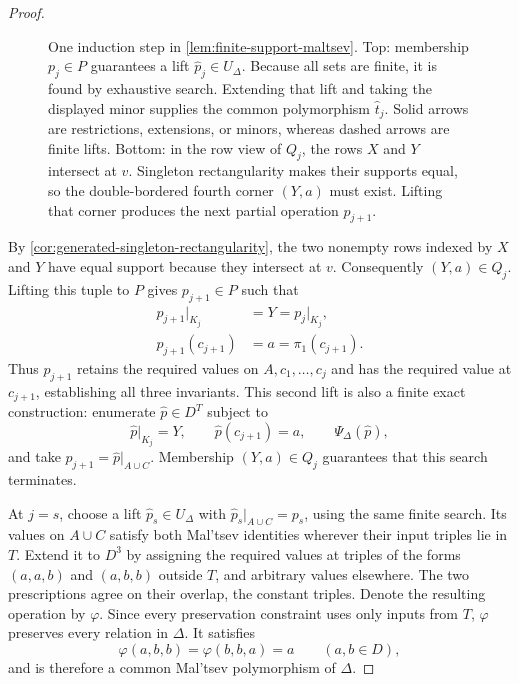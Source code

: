 \documentclass[11pt,letterpaper,onecolumn]{article}
\theoremstyle{plain}
\theoremstyle{definition}
\theoremstyle{remark}
\begin{document}
\begin{proof}
\begin{figure}[!t]
{%
  }
  \caption{One induction step in
    \cref{lem:finite-support-maltsev}.  Top: membership $p_j\in P$
    guarantees a lift $\widehat p_j\in U_\Delta$. Because all sets are
    finite, it is found by exhaustive search.  Extending that lift and taking
    the displayed minor supplies the common polymorphism $\widehat t_j$.  Solid arrows
    are restrictions, extensions, or minors, whereas dashed arrows are finite
    lifts.  Bottom: in the row view of $Q_j$, the rows $X$ and $Y$ intersect at
    $v$.  Singleton rectangularity makes their supports equal, so the
    double-bordered fourth corner $(Y,a)$ must exist.  Lifting that corner
    produces the next partial operation $p_{j+1}$.}
  \label{fig:finite-support-induction}
\end{figure}

By \cref{cor:generated-singleton-rectangularity}, the two nonempty rows
indexed by $X$ and $Y$ have equal support because they intersect at $v$.
Consequently $(Y,a)\in Q_j$.  Lifting this tuple to $P$ gives
$p_{j+1}\in P$ such that
\begin{equation*}
\begin{aligned}
  p_{j+1}|_{K_j}&=Y=p_j|_{K_j},\\
  p_{j+1}(c_{j+1})&=a=\pi_1(c_{j+1}).
\end{aligned}
\end{equation*}
Thus $p_{j+1}$ retains the required values on $A,c_1,\ldots,c_j$ and
has the required value at $c_{j+1}$, establishing all three invariants.
This second lift is also a finite exact construction: enumerate
$\widehat p\in D^T$ subject to
\[
  \widehat p|_{K_j}=Y,
  \qquad
  \widehat p(c_{j+1})=a,
  \qquad
  \Psi_\Delta(\widehat p),
\]
and take $p_{j+1}=\widehat p|_{A\cup C}$.  Membership
$(Y,a)\in Q_j$ guarantees that this search terminates.

At $j=s$, choose a lift $\widehat p_s\in U_\Delta$ with
$\widehat p_s|_{A\cup C}=p_s$, using the same finite search.
Its values on $A\cup C$ satisfy both Mal'tsev identities wherever their
input triples lie in $T$.  Extend it to $D^3$ by assigning the required
values at triples of the forms $(a,a,b)$ and $(a,b,b)$ outside $T$,
and arbitrary values elsewhere.  The two prescriptions agree on their
overlap, the constant triples.  Denote the resulting operation by
$\varphi$.  Since every preservation constraint uses only inputs from
$T$, $\varphi$ preserves every relation in $\Delta$.  It satisfies
\[
  \varphi(a,b,b)=\varphi(b,b,a)=a
  \qquad(a,b\in D),
\]
and is therefore a common Mal'tsev polymorphism of $\Delta$.
\end{proof}
\end{document}
